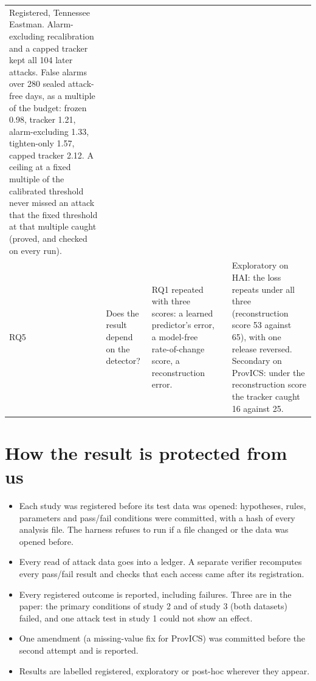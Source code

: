 \documentclass[9pt,a4paper]{extarticle}
\begin{document}
{\begin{tabularx}{\textwidth}{@{}P{0.6cm}P{2.6cm}P{3.9cm}P{2.1cm}L@{}}
Registered, Tennessee Eastman. Alarm-excluding recalibration and a capped tracker kept all 104 later
attacks. False alarms over 280 sealed attack-free days, as a multiple of the budget: frozen 0.98, tracker
1.21, alarm-excluding 1.33, tighten-only 1.57, capped tracker 2.12. A ceiling at a fixed multiple of the
calibrated threshold never missed an attack that the fixed threshold at that multiple caught (proved, and
checked on every run). \\
\addlinespace
RQ5 & Does the result depend on the detector? & RQ1 repeated with three scores: a learned predictor's
error, a model-free rate-of-change score, a reconstruction error. & &
Exploratory on HAI: the loss repeats under all three (reconstruction score 53 against 65), with one
release reversed. Secondary on ProvICS: under the reconstruction score the tracker caught 16 against 25. \\
\bottomrule
\end{tabularx}}

\section{How the result is protected from us}
\begin{itemize}
\item Each study was registered before its test data was opened: hypotheses, rules, parameters and
  pass/fail conditions were committed, with a hash of every analysis file. The harness refuses to run if a
  file changed or the data was opened before.
\item Every read of attack data goes into a ledger. A separate verifier recomputes every pass/fail result
  and checks that each access came after its registration.
\item Every registered outcome is reported, including failures. Three are in the paper: the primary
  conditions of study 2 and of study 3 (both datasets) failed, and one attack test in study 1 could not
  show an effect.
\item One amendment (a missing-value fix for ProvICS) was committed before the second attempt and is reported.
\item Results are labelled registered, exploratory or post-hoc wherever they appear.
\end{itemize}
\end{document}
